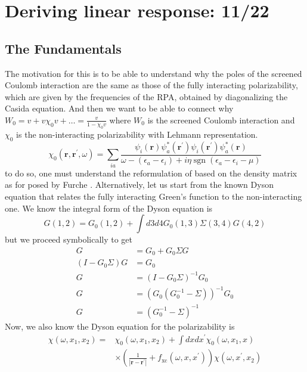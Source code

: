 \section{Deriving linear response: 11/22}
\subsection{The Fundamentals}
The motivation for this is to be able to understand why the poles of the screened Coulomb interaction are the same as those of the fully interacting polarizability, which are given by the frequencies of the RPA, obtained by diagonalizing the Casida equation. And then we want to be able to connect why $W_0 = v + v\chi_0 v + \ldots = \frac{v}{1-\chi_0 v}$ where $W_0$ is the screened Coulomb interaction and $\chi_0$ is the non-interacting polarizability with Lehmann representation. 
\begin{equation}
    \chi_{0}\left(\mathbf{r}, \mathbf{r}^{\prime}, \omega\right)=\sum_{ia}\frac{\psi_{i}(\mathbf{r}) \psi_{a}^{*}(\mathbf{r}^{\prime}) \psi_{i}(\mathbf{r}^{\prime}) \psi_{a}^{*}(\mathbf{r})}{\omega-\left(\epsilon_{a}-\epsilon_{i}\right)+i \eta \operatorname{sgn}\left(\epsilon_{a}-\epsilon_{i} - \mu\right)}
\end{equation}
to do so, one must understand the reformulation of based on the density matrix as for posed by Furche \cite{furche2001density}.
Alternatively, let us start from the known Dyson equation that relates the fully interacting Green's function to the non-interacting one. We know the integral form of the Dyson equation is
\begin{equation}
    G(1,2) = G_0(1,2) + \int d3 d4 G_0(1,3) \Sigma(3,4) G(4,2)
\end{equation}
but we proceed symbolically to get
\begin{align}
    G &= G_0 + G_0 \Sigma G \\
    \left(I - G_0 \Sigma\right) G &= G_0 \\
    G &= \left(I - G_0 \Sigma\right)^{-1} G_0 \\
    G &= \left(G_0\left(G_0^{-1} - \Sigma \right)\right)^{-1} G_0 \\
    G &= \left(G_0^{-1} - \Sigma \right)^{-1}
\end{align}
Now, we also know the Dyson equation for the polarizability is
\begin{equation}
    \begin{aligned}
\chi\left(\omega, x_1, x_2\right)= & \chi_0\left(\omega, x_1, x_2\right)+\int d x d x^{\prime} \chi_0\left(\omega, x_1, x\right) \\
& \times\left(\frac{1}{\left|\mathbf{r}-\mathbf{r}^{\prime}\right|}+f_{\mathrm{xc}}\left(\omega, x, x^{\prime}\right)\right) \chi\left(\omega, x^{\prime}, x_2\right)
\end{aligned}
\end{equation}
